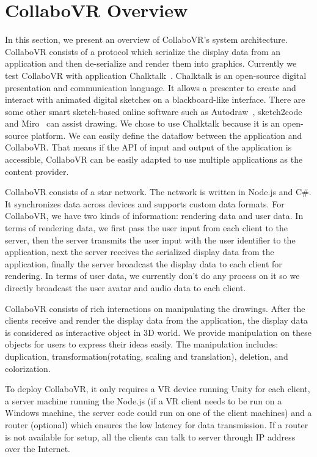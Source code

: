 \documentclass{sigchi}
\begin{document}

\section{CollaboVR Overview}
In this section, we present an overview of CollaboVR's system architecture. CollaboVR consists of a protocol which serialize the display data from an application and then de-serialize and render them into graphics. Currently we test CollaboVR with application Chalktalk~\cite{perlin2018chalktalk}. Chalktalk is an open-source digital presentation and communication language. It allows a presenter to create and interact with animated digital sketches on a blackboard-like interface. There are some other smart sketch-based online software such as Autodraw~\cite{Autodraw}, sketch2code~\cite{Sketch2code} and Miro~\cite{Miro} can assist drawing. We chose to use Chalktalk because it is an open-source platform. We can easily define the dataflow between the application and CollaboVR. That means if the API of input and output of the application is accessible, CollaboVR can be easily adapted to use multiple applications as the content provider.

CollaboVR consists of a star network. The network is written in Node.js and C\#. It synchronizes data across devices and supports custom data formats. For CollaboVR, we have two kinds of information: rendering data and user data. In terms of rendering data, we first pass the user input from each client to the server, then the server transmits the user input with the user identifier to the application, next the server receives the serialized display data from the application, finally the server broadcast the display data to each client for rendering. In terms of user data, we currently don't do any process on it so we directly broadcast the user avatar and audio data to each client.

CollaboVR consists of rich interactions on manipulating the drawings. After the clients receive and render the display data from the application, the display data is considered as interactive object in 3D world. We provide manipulation on these objects for users to express their ideas easily. The manipulation includes: duplication, transformation(rotating, scaling and translation), deletion, and colorization.

To deploy CollaboVR, it only requires a VR device running Unity for each client, a server machine running the Node.js (if a VR client needs to be run on a Windows machine, the server code could run on one of the client machines) and a router (optional) which ensures the low latency for data transmission. If a router is not available for setup, all the clients can talk to server through IP address over the Internet. 
\end{document}
